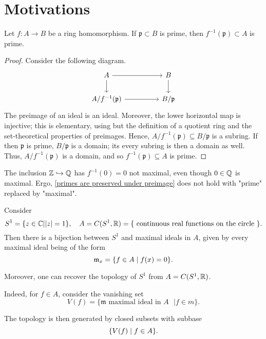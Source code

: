 \section{Motivations}

\begin{lemma}
  \label{primes are preserved under preimage}
  Let $f:A \to B$ be a ring homomorphism. If $\mathfrak p \subset B$ is prime, then $f^{-1}(\mathfrak p) \subset A$ is prime.
\end{lemma}

\begin{proof}
  Consider the following diagram.
  \begin{equation*}
  \begin{tikzcd}[column sep = huge]
    A \arrow[r] \arrow[d]
    & B \arrow[d] \\
    A /{ f^{-1}(\mathfrak p) } \arrow[r]
    & B /{\mathfrak p}
  \end{tikzcd}
\end{equation*}
The preimage of an ideal is an ideal. Moreover, the lower horizontal map is injective; this is elementary, using but the definition of a quotient ring and the set-theoretical properties of preimages. Hence,
  $A /{f^{-1}(\mathfrak p)} \subseteq B /{\mathfrak p}$
  is a subring. If then $\mathfrak p$ is prime, $B /{\mathfrak p}$ is a domain; its every subring is then a domain as well. Thus,
$A / {f^{-1}(\mathfrak p)}$
is a domain, and so
$f^{-1}(\mathfrak p) \subseteq A$
is prime.
\end{proof}

\begin{example}
The inclusion $\mathbb Z \hookrightarrow \mathbb Q$ has $f^{-1}(0) = 0$ not maximal, even though $0 \in \mathbb Q$ is maximal.
Ergo, \cref{primes are preserved under preimage} does not hold with "prime" replaced by "maximal".
\end{example}

\begin{example}
  \label{mot-circle}
  Consider
  \[ S^1 = \{ z \in \mathbb C | |z|=1 \}, \quad A = C(S^1, \mathbb R) = \{ \text{ continuous real functions on the circle } \}.\]
  Then there is a bijection between $S^1$ and maximal ideals in $A$, given by every maximal ideal being of the form
  \[\mathfrak m_x = \{ f \in A \mathrel{|} f(x) = 0 \} .\]

  Moreover, one can recover the topology of $S^1$ from $A = C(S^1, \mathbb R)$.

  Indeed, for $f \in A$, consider the vanishing set
  \[ V(f) = \{ \mathfrak m \text{ maximal ideal in $A$ } | f \in m \}.\]

  The topology is then generated by closed subsets with subbase
  \[\{V(f) \mathrel{|} f \in A\}.\]
\end{example}

